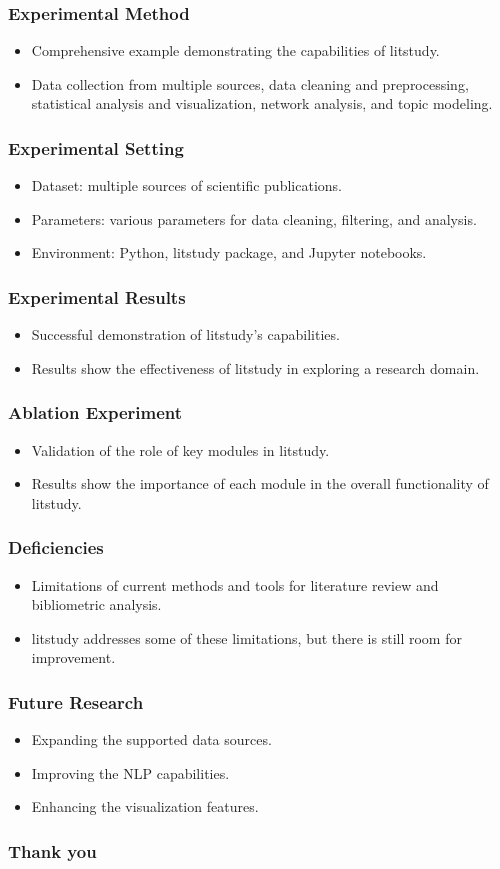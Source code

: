 \documentclass{beamer}
\begin{document}
\begin{frame}
\frametitle{Experimental Method}
\begin{itemize}
\item Comprehensive example demonstrating the capabilities of litstudy.
\item Data collection from multiple sources, data cleaning and preprocessing, statistical analysis and visualization, network analysis, and topic modeling.
\end{itemize}
\end{frame}

\begin{frame}
\frametitle{Experimental Setting}
\begin{itemize}
\item Dataset: multiple sources of scientific publications.
\item Parameters: various parameters for data cleaning, filtering, and analysis.
\item Environment: Python, litstudy package, and Jupyter notebooks.
\end{itemize}
\end{frame}

\begin{frame}
\frametitle{Experimental Results}
\begin{itemize}
\item Successful demonstration of litstudy's capabilities.
\item Results show the effectiveness of litstudy in exploring a research domain.
\end{itemize}
\end{frame}

\begin{frame}
\frametitle{Ablation Experiment}
\begin{itemize}
\item Validation of the role of key modules in litstudy.
\item Results show the importance of each module in the overall functionality of litstudy.
\end{itemize}
\end{frame}

\begin{frame}
\frametitle{Deficiencies}
\begin{itemize}
\item Limitations of current methods and tools for literature review and bibliometric analysis.
\item litstudy addresses some of these limitations, but there is still room for improvement.
\end{itemize}
\end{frame}

\begin{frame}
\frametitle{Future Research}
\begin{itemize}
\item Expanding the supported data sources.
\item Improving the NLP capabilities.
\item Enhancing the visualization features.
\end{itemize}
\end{frame}

\begin{frame}
\frametitle{Thank you}
\end{frame}
\end{document}
